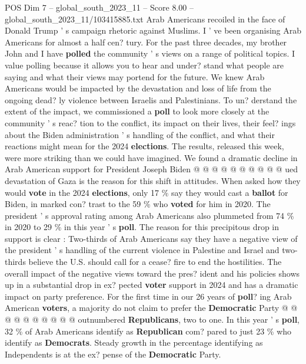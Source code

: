 \begin{textsample}{POS Dim 7 – global\_south\_2023\_11 – Score 8.00 – global\_south\_2023\_11/103415885.txt}  \label{ex:f7_pos_300}
Arab Americans recoiled in the face of Donald Trump ' s campaign rhetoric against Muslims.
I ' ve been organising Arab Americans for almost a half cen? tury.
For the past three decades, my brother John and I have \textbf{polled} the community ' s views on a range of political topics.
I value polling because it allows you to hear and under? stand what people are saying and what their views may portend for the future.
We knew Arab Americans would be impacted by the devastation and loss of life from the ongoing dead? ly violence between Israelis and Palestinians.
To un? derstand the extent of the impact, we commissioned a \textbf{poll} to look more closely at the community ' s reac? tion to the conflict, its impact on their lives, their feel? ings about the Biden administration ' s handling of the conflict, and what their reactions might mean for the 2024 \textbf{elections}.
The results, released this week, were more striking than we could have imagined.
We found a dramatic decline in Arab American support for President Joseph Biden @ @ @ @ @ @ @ @ @ @ ued devastation of Gaza is the reason for this shift in attitudes.
When asked how they would \textbf{vote} in the 2024 \textbf{elections}, only 17 \% say they would cast a \textbf{ballot} for Biden, in marked con? trast to the 59 \% who \textbf{voted} for him in 2020.
The president ' s approval rating among Arab Americans also plummeted from 74 \% in 2020 to 29 \% in this year ' s \textbf{poll}.
The reason for this precipitous drop in support is clear : Two-thirds of Arab Americans say they have a negative view of the president ' s handling of the current violence in Palestine and Israel and two-thirds believe the U.S. should call for a cease? fire to end the hostilities.
The overall impact of the negative views toward the pres? ident and his policies shows up in a substantial drop in ex? pected \textbf{voter} support in 2024 and has a dramatic impact on party preference.
For the first time in our 26 years of \textbf{poll}? ing Arab American \textbf{voters}, a majority do not claim to prefer the \textbf{Democratic} Party @ @ @ @ @ @ @ @ @ @ outnumbered \textbf{Republicans}, two to one.
In this year ' s \textbf{poll}, 32 \% of Arab Americans identify as \textbf{Republican} com? pared to just 23 \% who identify as \textbf{Democrats}.
Steady growth in the percentage identifying as Independents is at the ex? pense of the \textbf{Democratic} Party.

\end{textsample}
